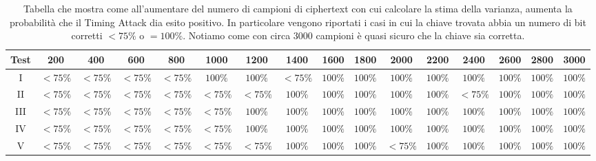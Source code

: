 \documentclass{article}
\begin{document}
\begin{table*}[t]
    \hskip-4.45cm
        \begin{tabular}{ c || c | c | c | c | c | c | c | c | c | c | c | c | c | c | c }
         Test&200&400&600&800&1000&1200&1400&1600&1800&2000&2200&2400&2600&2800&3000\\\hline \hline
         I&$<\!75\%$&$<\! 75\%$&$< \!75\%$&$< \!75\%$&$100\%$&$100\%$&$<\! 75\%$&$100\%$&$100\%$&$100\%$&$100\%$&$100\%$&$100\%$&$100\%$&$100\%$\\ \hline
         
         II&$<\! 75\%$&$< \!75\%$&$<\! 75\%$&$< \!75\%$&$< \!75\%$&$< \!75\%$&$100\%$&$100\%$&$100\%$&$100\%$&$100\%$&$<\! 75\%$&$100\%$&$100\%$&$100\%$\\  \hline
         
         III&$< \!75\%$&$<\! 75\%$&$<\! 75\%$&$<\! 75\%$&$< \!75\%$&$100\%$&$100\%$&$100\%$&$100\%$&$100\%$&$100\%$&$100\%$&$100\%$&$100\%$&$100\%$\\ \hline
         
         IV&$< \!75\%$&$<\! 75\%$&$< \!75\%$&$< \!75\%$&$<\! 75\%$&$100\%$&$100\%$&$100\%$&$100\%$&$100\%$&$100\%$&$100\%$&$100\%$&$100\%$&$100\%$\\\hline 
         V&$< \!75\%$&$< \!75\%$&$< \!\!75\%$&$<\! 75\%$&$< \!75\%$&$< \!75\%$&$100\%$&$100\%$&$100\%$&$<\! 75\%$&$100\%$&$100\%$&$100\%$&$100\%$&$100\%$\\
         
        \end{tabular}
    \caption{Tabella che mostra come all'aumentare del numero di campioni di ciphertext con cui calcolare la stima della varianza, aumenta la probabilità che il Timing Attack dia esito positivo. In particolare vengono riportati i casi in cui la chiave trovata abbia un numero di bit corretti $< 75\%$ o $ = 100\%$. Notiamo come con circa 3000 campioni è quasi sicuro che la chiave sia corretta.}
    \label{tab:correctness}
\end{table*}
\end{document}
